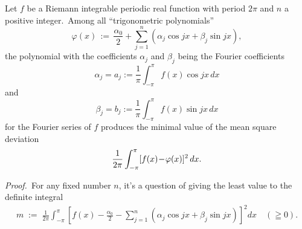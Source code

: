 \documentclass[12pt]{article}
\theoremstyle{definition}
\begin{document}

Let $f$ be a Riemann integrable periodic real function with period $2\pi$ and $n$ a positive integer.\, Among all ``trigonometric polynomials''
$$\varphi(x) \,:=\, \frac{\alpha_0}{2}\!+\!\sum_{j=1}^n(\alpha_j\cos{jx}+\beta_j\sin{jx}),$$
the polynomial with the coefficients $\alpha_j$ and $\beta_j$ being the Fourier coefficients
$$\alpha_j = a_j := \frac{1}{\pi}\int_{-\pi}^{\pi} f(x)\cos{jx}\,dx$$
and
$$\beta_j = b_j := \frac{1}{\pi}\int_{-\pi}^{\pi} f(x)\sin{jx}\,dx$$
for the Fourier series of $f$ produces the minimal value of the mean square deviation
$$\frac{1}{2\pi}\int_{-\pi}^\pi[f(x)\!-\!\varphi(x)]^2\,dx.\\$$


{\em Proof.}\, For any fixed number $n$, it's a question of giving the least value to the definite integral
\begin{align}
m \;:=\; \frac{1}{2\pi}\int_{-\pi}^\pi\left[f(x)-\frac{\alpha_0}{2}\!-\!\sum_{j=1}^n(\alpha_j\cos{jx}+\beta_j\sin{jx})\right]^2dx 
\quad (\geqq 0).
\end{align}
\end{document}
